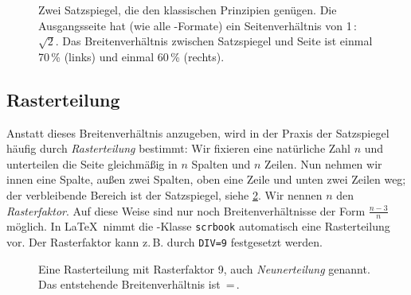 \begin{figure}
  \centering
  \quad
  \caption{Zwei Satzspiegel, die den klassischen Prinzipien genügen. Die
    Ausgangsseite hat (wie alle -Formate) ein Seitenverhältnis von
    1\,:\,$\sqrt{\text{2}}$. Das Breitenverhältnis zwischen Satzspiegel und Seite ist
    einmal 70\,\% (links) und einmal 60\,\% (rechts).}\label{fig:Satzspiegel}
\end{figure}

\subsection{Rasterteilung}

Anstatt dieses Breitenverhältnis anzugeben, wird in der Praxis der Satzspiegel
häufig durch \emph{Rasterteilung} bestimmt: Wir fixieren eine natürliche Zahl
$n$ und unterteilen die Seite gleichmäßig in $n$ Spalten und $n$ Zeilen. Nun
nehmen wir innen eine Spalte, außen zwei Spalten, oben eine Zeile und unten zwei
Zeilen weg; der verbleibende Bereich ist der Satzspiegel, siehe
\cref{fig:DIV}. Wir nennen $n$ den \emph{Rasterfaktor}. Auf diese
Weise sind nur noch Breitenverhältnisse der Form $\frac{n-3}{n}$ möglich. In
\LaTeX\ nimmt die -Klasse \verb!scrbook! automatisch eine
Rasterteilung vor. Der Rasterfaktor kann z.\,B. durch \verb!DIV=9!
festgesetzt werden.

\begin{figure}
  \centering
  \caption{Eine Rasterteilung mit Rasterfaktor 9, auch
    \emph{Neunerteilung} genannt. Das entstehende Breitenverhältnis ist
    \,=\,.}\label{fig:DIV}
\end{figure}



